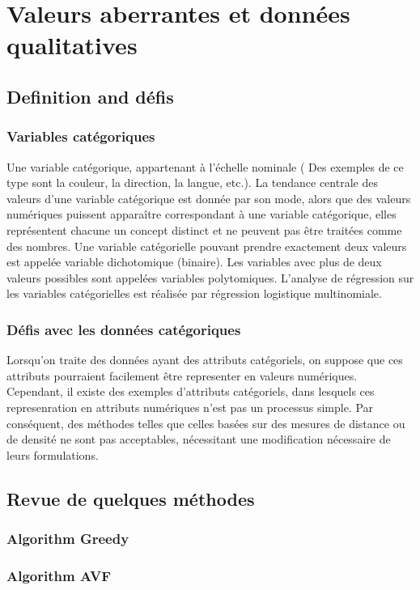 \section{Valeurs aberrantes et données qualitatives}  
%
\subsection{Definition and défis}
%

\subsubsection*{Variables catégoriques}
Une variable catégorique, appartenant à l’échelle nominale  ( Des exemples de ce type sont la couleur, la direction, la langue, etc.). 
La tendance centrale des valeurs d'une variable catégorique est donnée par son mode, alors que des valeurs numériques puissent apparaître correspondant à une variable catégorique, elles représentent chacune un concept distinct et ne peuvent pas être traitées comme des nombres. 
Une variable catégorielle pouvant prendre exactement deux valeurs est appelée variable dichotomique (binaire). Les variables avec plus de deux valeurs possibles sont appelées variables polytomiques. L'analyse de régression sur les variables catégorielles est réalisée par régression logistique multinomiale.



\subsubsection*{Défis avec les données catégoriques}
Lorsqu'on traite des données ayant des attributs catégoriels, on suppose que ces attributs  pourraient facilement être representer en valeurs numériques. Cependant, il existe des exemples d'attributs catégoriels, dans lesquels ces represenration en attributs numériques n'est pas un processus simple. Par conséquent, des méthodes telles que celles basées sur des mesures de distance ou de densité ne sont pas acceptables, nécessitant une modification nécessaire de leurs formulations.

\subsection{Revue de quelques méthodes}

\subsubsection*{Algorithm Greedy}



\subsubsection*{Algorithm AVF}


